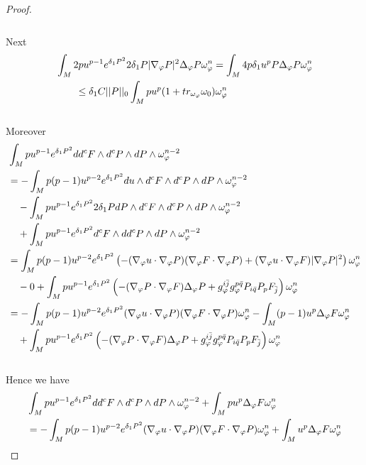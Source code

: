 \documentclass[11pt]{amsart}
\numberwithin{equation}{section}
\begin{document}
\begin{proof}
\begin{align}
\end{align}\\
Next
\begin{align}
	&\int_M2pu^{p-1}e^{\delta_1P^2}2\delta_1P |\nabla_{\varphi}P|^2 \Delta_{\varphi}P\omega_{\varphi}^n = \int_M 4p\delta_1 u^p P\Delta_\varphi P\omega_\varphi^n \notag\\
	& \qquad \le \delta_1C ||P||_0\int_M pu^p  (1+tr_{\omega_{\varphi}}\omega_0)\omega_\varphi^n 
\end{align}\\
Moreover
\begin{align}
	&\int_Mpu^{p-1}e^{\delta_1P^2}dd^cF\wedge d^cP\wedge dP\wedge \omega_{\varphi}^{n-2} \notag \\
	&=-\int_Mp(p-1)u^{p-2}e^{\delta_1P^2}du\wedge d^cF\wedge d^cP\wedge dP\wedge \omega_{\varphi}^{n-2} \notag \\
	&\quad-\int_Mpu^{p-1}e^{\delta_1P^2}2\delta_1P dP\wedge d^cF\wedge d^cP\wedge dP\wedge \omega_{\varphi}^{n-2} \notag \\
	&\quad +\int_Mpu^{p-1}e^{\delta_1P^2}d^cF\wedge dd^cP\wedge dP\wedge \omega_{\varphi}^{n-2} \notag\\
	&= \int_Mp(p-1)u^{p-2}e^{\delta_1P^2}\left( -(\nabla_\varphi u\cdot\nabla_\varphi P)(\nabla_\varphi F\cdot\nabla_\varphi P) + (\nabla_\varphi u\cdot \nabla_\varphi F) |\nabla_\varphi P|^2 \right)  \omega_{\varphi}^{n} \notag \\
	&\quad-0+\int_M pu^{p-1}e^{\delta_1P^2}\left(-(\nabla_\varphi P\cdot \nabla_\varphi F)\Delta_\varphi P+ g_\varphi^{i\bar j}g_\varphi^{p\bar q}P_{i\bar q}P_{p}F_{\bar j} \right)  \omega_{\varphi}^{n} \notag\\
	&= -\int_Mp(p-1)u^{p-2}e^{\delta_1P^2} (\nabla_\varphi u\cdot\nabla_\varphi P)(\nabla_\varphi F\cdot\nabla_\varphi P)\omega_\varphi^n - \int_M (p-1)u^p\Delta_{\varphi}F\omega_{\varphi}^n \notag\\
	&\quad + \int_M pu^{p-1}e^{\delta_1P^2}\left(-(\nabla_\varphi P\cdot \nabla_\varphi F)\Delta_\varphi P+ g_\varphi^{i\bar j}g_\varphi^{p\bar q}P_{i\bar q}P_{p}F_{\bar j} \right)  \omega_{\varphi}^{n}
\end{align}\\
Hence we have 
\begin{align}
	&\int_Mpu^{p-1}e^{\delta_1P^2}dd^cF\wedge d^cP\wedge dP\wedge \omega_{\varphi}^{n-2} + \int_Mpu^p\Delta_{\varphi}F\omega_{\varphi}^n \notag\\
	& = -\int_Mp(p-1)u^{p-2}e^{\delta_1P^2} (\nabla_\varphi u\cdot\nabla_\varphi P)(\nabla_\varphi F\cdot\nabla_\varphi P)\omega_\varphi^n + \int_M u^p\Delta_{\varphi}F\omega_{\varphi}^n \notag\\

\end{align}
\end{proof}
\end{document}
